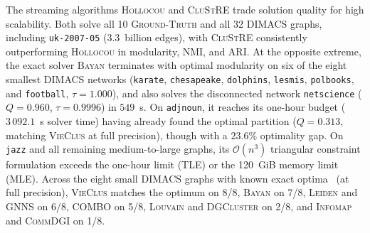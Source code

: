 \documentclass[11pt,a4paper]{article}
\begin{document}
The streaming algorithms \textsc{Hollocou} and \textsc{CluStRE} trade solution quality for high scalability. Both solve all 10 \textsc{Ground-Truth} and all 32 \textsc{DIMACS} graphs, including \texttt{uk-2007-05} ($3.3$~billion edges), with \textsc{CluStRE} consistently outperforming \textsc{Hollocou} in modularity, NMI, and ARI. At the opposite extreme, the exact solver \textsc{Bayan} terminates with optimal modularity on six of the eight smallest \textsc{DIMACS} networks (\texttt{karate}, \texttt{chesapeake}, \texttt{dolphins}, \texttt{lesmis}, \texttt{polbooks}, and \texttt{football}, $\tau = 1.000$), and also solves the disconnected network \texttt{netscience} ($Q = 0.960$, $\tau = 0.9996$) in $549$~s. On \texttt{adjnoun}, it reaches its one-hour budget ($3\,092.1$~s solver time) having already found the optimal partition ($Q = 0.313$, matching \textsc{VieClus} at full precision), though with a $23.6\%$ optimality gap. On \texttt{jazz} and all remaining medium-to-large graphs, its $\mathcal{O}(n^3)$ triangular constraint formulation exceeds the one-hour limit (\textsc{TLE}) or the 120~GiB memory limit (\textsc{MLE}). Across the eight small \textsc{DIMACS} graphs with known exact optima~\cite{bayan2024,maxsat2025} (at full precision), \textsc{VieClus} matches the optimum on 8/8, \textsc{Bayan} on 7/8, \textsc{Leiden} and \textsc{GNNS} on 6/8, \textsc{COMBO} on 5/8, \textsc{Louvain} and \textsc{DGCluster} on 2/8, and \textsc{Infomap} and \textsc{CommDGI} on 1/8.

\end{document}
